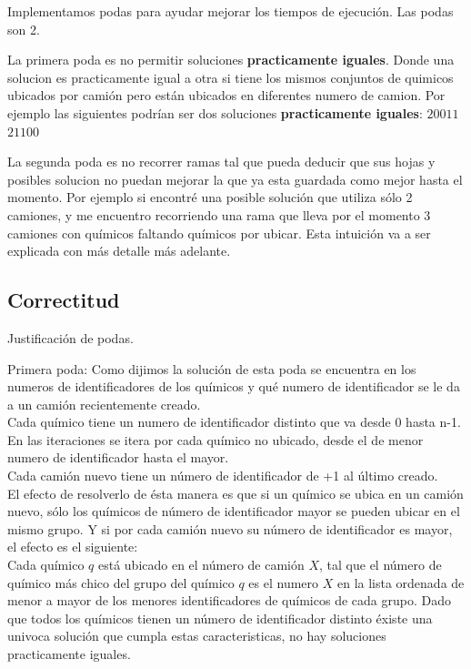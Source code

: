 \noindent
Implementamos podas para ayudar mejorar los tiempos de ejecuci\'on. Las podas son 2. 

\noindent
La primera poda es no permitir soluciones \textbf{practicamente iguales}. Donde una solucion es practicamente igual a otra si tiene los mismos conjuntos de quimicos ubicados por cami\'on pero est\'an ubicados en diferentes numero de camion. Por ejemplo las siguientes podr\'ian ser dos soluciones \textbf{practicamente iguales}:
$2 0 0 1 1$
$2 1 1 0 0$
 
\noindent
La segunda poda es no recorrer ramas tal que pueda deducir que sus hojas y posibles solucion no puedan mejorar la que ya esta guardada como mejor hasta el momento. Por ejemplo si encontr\'e una posible soluci\'on que utiliza s\'olo 2 camiones, y me encuentro recorriendo una rama que lleva por el momento 3 camiones con qu\'imicos faltando qu\'imicos por ubicar. Esta intuici\'on va a ser explicada con m\'as detalle m\'as adelante.


\subsection{Correctitud}

\noindent
Justificaci\'on de podas.

\noindent
Primera poda: 
Como dijimos la soluci\'on de esta poda se encuentra en los numeros de identificadores de los qu\'imicos y qu\'e numero de identificador se le da a un cami\'on recientemente creado.\\
Cada qu\'imico tiene un numero de identificador distinto que va desde 0 hasta n-1. En las iteraciones se itera por cada qu\'imico no ubicado, desde el de menor numero de identificador hasta el mayor.\\ 
Cada cami\'on nuevo tiene un n\'umero de identificador de +1 al \'ultimo creado. \\
El efecto de resolverlo de \'esta manera es que si un qu\'imico se ubica en un cami\'on nuevo, s\'olo los qu\'imicos de n\'umero de identificador mayor se pueden ubicar en el mismo grupo. Y si por cada cami\'on nuevo su n\'umero de identificador es mayor, el efecto es el siguiente:\\
Cada qu\'imico $q$ est\'a ubicado en el n\'umero de cami\'on $X$, tal que el n\'umero de qu\'imico m\'as chico del grupo del qu\'imico $q$ es el numero $X$ en la lista ordenada de menor a mayor de los menores identificadores de qu\'imicos de cada grupo. Dado que todos los qu\'imicos tienen un n\'umero de identificador distinto \'existe una univoca soluci\'on que cumpla estas caracteristicas, no hay soluciones practicamente iguales.\\

